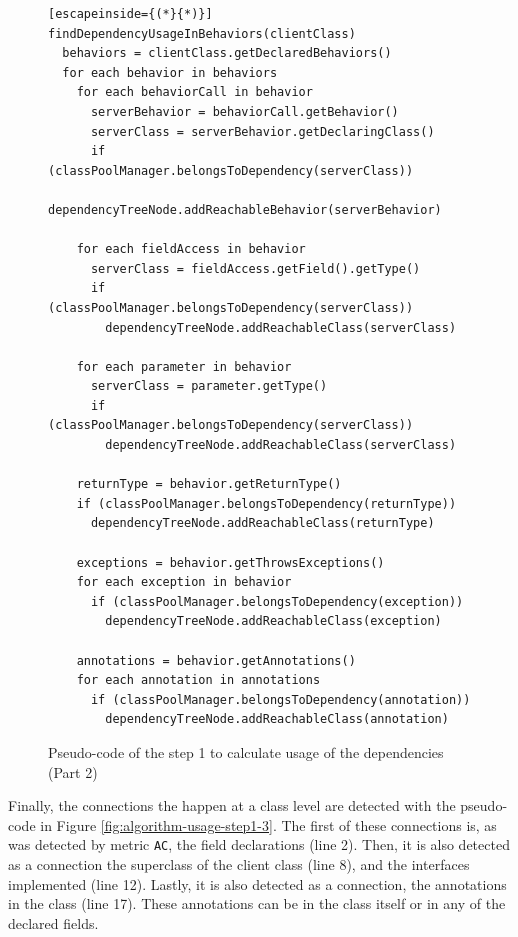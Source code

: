 \begin{figure}[h]
\begin{lstlisting}[escapeinside={(*}{*)}]
findDependencyUsageInBehaviors(clientClass)
  behaviors = clientClass.getDeclaredBehaviors()
  for each behavior in behaviors
    for each behaviorCall in behavior
      serverBehavior = behaviorCall.getBehavior()
      serverClass = serverBehavior.getDeclaringClass()
      if (classPoolManager.belongsToDependency(serverClass))
        dependencyTreeNode.addReachableBehavior(serverBehavior)

    for each fieldAccess in behavior
      serverClass = fieldAccess.getField().getType()
      if (classPoolManager.belongsToDependency(serverClass))
        dependencyTreeNode.addReachableClass(serverClass)

    for each parameter in behavior
      serverClass = parameter.getType()
      if (classPoolManager.belongsToDependency(serverClass))
        dependencyTreeNode.addReachableClass(serverClass)

    returnType = behavior.getReturnType()
    if (classPoolManager.belongsToDependency(returnType))
      dependencyTreeNode.addReachableClass(returnType)

    exceptions = behavior.getThrowsExceptions()
    for each exception in behavior
      if (classPoolManager.belongsToDependency(exception))
        dependencyTreeNode.addReachableClass(exception)

    annotations = behavior.getAnnotations()
    for each annotation in annotations
      if (classPoolManager.belongsToDependency(annotation))
        dependencyTreeNode.addReachableClass(annotation)
\end{lstlisting}
\caption{Pseudo-code of the step 1 to calculate usage of the dependencies (Part 2)}
\label{fig:algorithm-usage-step1-2}
\end{figure}

Finally, the connections the happen at a class level are detected with the pseudo-code in Figure \ref{fig:algorithm-usage-step1-3}. The first of these connections is, as was detected by metric \texttt{AC}, the field declarations (line 2). Then, it is also detected as a connection the superclass of the client class (line 8), and the interfaces implemented (line 12). Lastly, it is also detected as a connection, the annotations in the class (line 17). These annotations can be in the class itself or in any of the declared fields.

